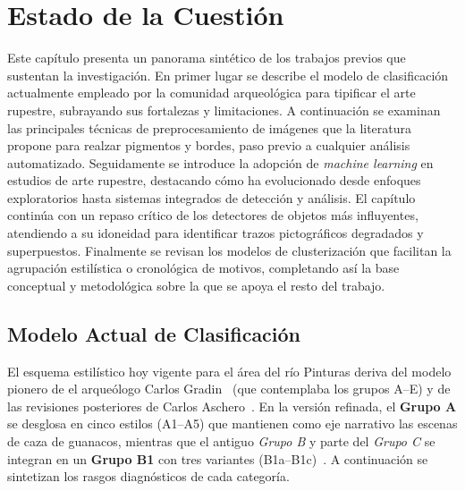 \section{Estado de la Cuestión}\label{sec:estado_cuestion}

Este capítulo presenta un panorama sintético de los trabajos previos que sustentan la investigación.
En primer lugar se describe el modelo de clasificación actualmente empleado por la comunidad arqueológica para tipificar el arte rupestre, subrayando sus fortalezas y limitaciones.
A continuación se examinan las principales técnicas de preprocesamiento de imágenes que la literatura propone para realzar pigmentos y bordes, paso previo a cualquier análisis automatizado.
Seguidamente se introduce la adopción de \emph{machine learning} en estudios de arte rupestre, destacando cómo ha evolucionado desde enfoques exploratorios hasta sistemas integrados de detección y análisis.
El capítulo continúa con un repaso crítico de los detectores de objetos más influyentes, atendiendo a su idoneidad para identificar trazos pictográficos degradados y superpuestos.
Finalmente se revisan los modelos de clusterización que facilitan la agrupación estilística o cronológica de motivos, completando así la base conceptual y metodológica sobre la que se apoya el resto del trabajo.

\subsection{Modelo Actual de Clasificación}

El esquema estilístico hoy vigente para el área del río Pinturas deriva del modelo pionero de el arqueólogo Carlos Gradin~\cite{gradin1979} (que contemplaba los grupos A–E) y de las revisiones posteriores de Carlos Aschero~\cite{aschero2012,aschero2018b}.
En la versión refinada, el \textbf{Grupo A} se desglosa en cinco estilos (A1–A5) que mantienen como eje narrativo las escenas de caza de guanacos, mientras que el antiguo \emph{Grupo B} y parte del \emph{Grupo C} se integran en un \textbf{Grupo B1} con tres variantes (B1a–B1c)~\cite{aschero2021,aschero2023}.
A continuación se sintetizan los rasgos diagnósticos de cada categoría.

